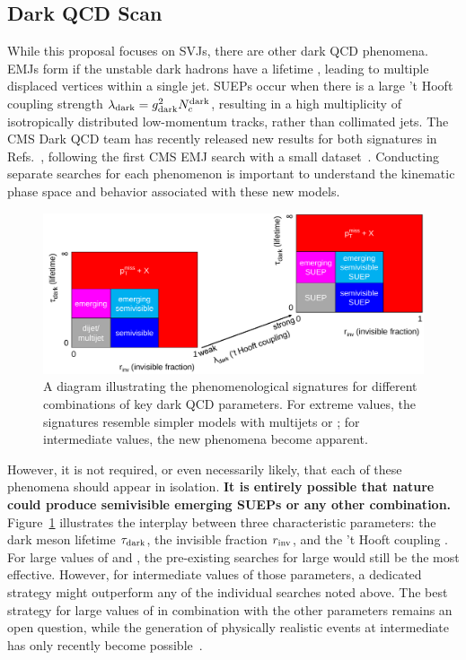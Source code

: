 \subsection{Dark QCD Scan}\label{subsec:darkscan}

While this proposal focuses on SVJs, there are other dark QCD phenomena.
EMJs form if the unstable dark hadrons have a lifetime \taudark, leading to multiple displaced vertices within a single jet.
SUEPs occur when there is a large 't Hooft coupling strength $\lambda_\text{dark} = g_{\mathrm{dark}}^2 N_{c}^{\text{dark}}$,
resulting in a high multiplicity of isotropically distributed low-momentum tracks, rather than collimated jets.
The CMS Dark QCD team has recently released new results for both signatures in Refs.~\cite{CMS:2024nca,CMS:2024gxp},
following the first CMS EMJ search with a small dataset~\cite{Sirunyan:2018njd}.
Conducting separate searches for each phenomenon is important to understand the kinematic phase space and behavior associated with these new models.

\begin{figure}[bht]
\centering
\includegraphics[width=0.95\myfigurewidth]{figures/svj_acceptance_diagram_v7.pdf}
\caption{A diagram illustrating the phenomenological signatures for different combinations of key dark QCD parameters.
For extreme values, the signatures resemble simpler models with multijets or \ptmiss; for intermediate values, the new phenomena become apparent.
}
\label{fig:svjacc}
\end{figure}

However, it is not required, or even necessarily likely, that each of these phenomena should appear in isolation.
\textbf{It is entirely possible that nature could produce semivisible emerging SUEPs or any other combination.}
Figure~\ref{fig:svjacc} illustrates the interplay between three characteristic parameters:
the dark meson lifetime $\tau_\text{dark}$, the invisible fraction $r_{\mathrm{inv}}$, and the 't Hooft coupling \thooft.
For large values of \rinv and \taudark, the pre-existing searches for large \met would still be the most effective.
However, for intermediate values of those parameters, a dedicated strategy might outperform any of the individual searches noted above.
The best strategy for large values of \thooft in combination with the other parameters remains an open question,
while the generation of physically realistic events at intermediate \thooft has only recently become possible~\cite{Cesarotti:2020uod}.

